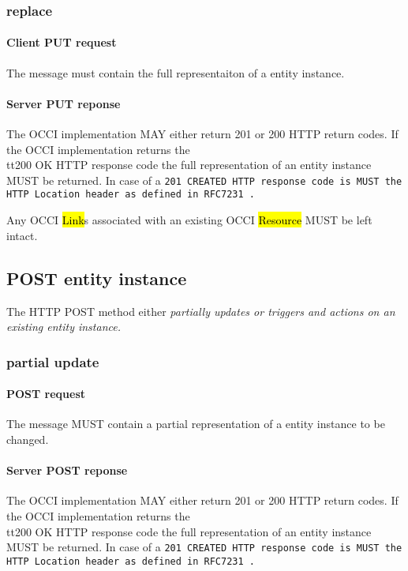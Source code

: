 \documentclass[10pt,a4paper]{article}
\begin{document}
\subsubsection{replace}

\paragraph{Client PUT request}
The message must contain the full representaiton of a entity instance.

\paragraph{Server PUT reponse}
The OCCI implementation MAY either return 201 or 200 HTTP return codes. If the OCCI implementation
returns the \\tt{200 OK} HTTP response code the full representation of an entity instance MUST be returned. 
In case of a \tt{201 CREATED} HTTP response code is MUST the HTTP Location header as defined in RFC7231 \cite{rfc7231}.

Any OCCI \hl{Link}s associated with an existing OCCI \hl{Resource} MUST be left intact.

\subsection{POST entity instance}
The HTTP POST method either \em{partially updates} or triggers and \em{actions} on an existing entity instance.

\subsubsection{partial update}

\paragraph{POST request}
The message MUST contain a partial representation of a entity instance to be changed.

\paragraph{Server POST reponse}
The OCCI implementation MAY either return 201 or 200 HTTP return codes. If the OCCI implementation
returns the \\tt{200 OK} HTTP response code the full representation of an entity instance MUST be returned. 
In case of a \tt{201 CREATED} HTTP response code is MUST the HTTP Location header as defined in RFC7231 \cite{rfc7231}.
\end{document}
